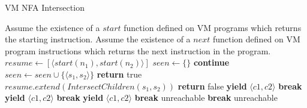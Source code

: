 \begin{algorithm}
\caption{VM NFA Intersection} \label{algo:regexinter}
\begin{algorithmic}
  \State Assume the existence of a $start$ function defined on
          VM programs which returns the starting instruction.
  \State Assume the existence of a $next$ function defined on
          VM program instructions which returns the next instruction
          in the program.
  \State $resume \gets [\langle start(n_1), start(n_2) \rangle]$
  \State $seen \gets \{\}$
      \State \textbf{continue}
    \EndIf
    \State $seen \gets seen \cup \{\langle s_1, s_2 \rangle\}$
      \State \textbf{return} true
    \EndIf
    \State $resume.extend(IntersectChildren(s_1, s_2))$
  \EndWhile
  \State \textbf{return} false
\EndProcedure
{}
          \State \textbf{yield} $\langle c1, c2 \rangle$
          \State \textbf{break}
        \EndCase
              \State \textbf{yield} $\langle c1, c2 \rangle$
              \State \textbf{break}
            \EndCase
              \If{$\alpha_1 \cap \alpha_2 \not= \emptyset$}
                \State \textbf{yield} $\langle c1, c2 \rangle$
              \EndIf
              \State \textbf{break}
            \EndCase
              \State unreachable
            \EndCase
          \EndSwitch
          \State \textbf{break}
        \EndCase
          \State unreachable
        \EndCase
      \EndSwitch
    \EndFor
  \EndFor
\EndProcedure
\end{algorithmic}
\end{algorithm}

